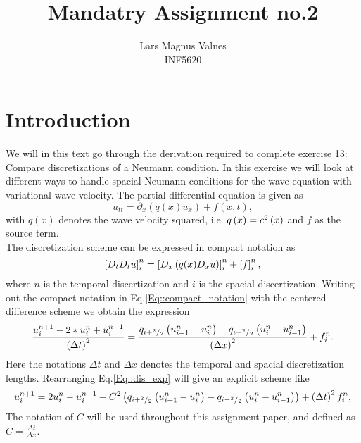 \documentclass[11pt]{article}
\begin{document}
\setlength\parindent{0pt}
\title{Mandatry Assignment no.2}
\author{Lars Magnus Valnes \\  
INF5620 
}
\maketitle

\section{Introduction}
We will in this text go through the derivation required to complete exercise 13: Compare discretizations of a Neumann condition. In this exercise we will look at different ways to handle spacial Neumann conditions for the wave equation with variational wave velocity. 
The partial differential equation is given as
\begin{equation}
u_{tt}= \partial_x \left( q(x) u_{x} \right)+ f(x,t),
\end{equation} 
with $q(x)$ denotes the wave velocity squared, i.e. $q\left( x\right) =c\sp{2} \left( x\right) $ and $f$ as the source term.
\\
The discretization scheme can be expressed in compact notation as 
\begin{equation}
\left[ D_tD_t u \right]_{i}\sp{n} = \left[D_x \left(q(x) D_x u \right)\right]_{i}\sp{n} + \left[f\right]_{i}\sp{n},
\label{Eq::compact_notation}
\end{equation}
where $n$ is the temporal discertization and $i$ is the spacial discertization.
Writing out the compact notation in Eq.\ref{Eq::compact_notation} with the centered difference scheme we obtain the expression 
\begin{equation}
\frac{u\sp{n+1}_i-2*u\sp{n}_i+u\sp{n-1}_i    }{\left(\Delta t\right)\sp{2}}  =  \frac{ q_{i+\sp{2}/_{2}} \left( u\sp{n}_{i+1} -u\sp{n}_{i} \right) -  q_{i-\sp{2}/_{2}}  \left( u\sp{n}_{i} -u\sp{n}_{i-1} \right)}{\left(\Delta x\right)\sp{2}} + f\sp{n}_i .
\label{Eq::dis_exp}
\end{equation}
Here the notations $\Delta t$ and $\Delta x$ denotes the temporal and spacial discretization lengths.
Rearranging Eq.\ref{Eq::dis_exp} will give an explicit scheme like 
\begin{equation}
u\sp{n+1}_i  =  2u\sp{n}_i-u\sp{n-1}_i + C\sp{2} \left( q_{i+\sp{2}/_{2}} \left( u\sp{n}_{i+1} -u\sp{n}_{i} \right) -  q_{i-\sp{2}/_{2}}  \left( u\sp{n}_{i} -u\sp{n}_{i-1} \right) \right) +  \left(\Delta t\right)\sp{2}f\sp{n}_i ,
\label{Eq::explicit_scheme}
\end{equation}
The notation of $C$ will be used throughout this assignment paper, and defined as  $C = \frac{\Delta t}{\Delta x}$. 
\end{document}
